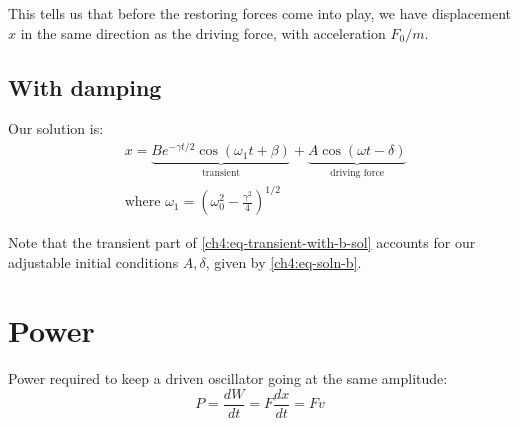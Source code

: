 This tells us that before the restoring forces come into play, we have displacement $x$ in the same direction as the driving force, with acceleration $F_0/m$.

\subsection{With damping}

Our solution is:
\begin{equation}
\boxed{
	\begin{split}
		&x = \underbrace{Be^{-\gamma t/2} \cos(\omega_1 t + \beta)}_\text{transient} + \underbrace{A\cos(\omega t - \delta)}_\text{driving force}
		\\
		&\text{where }
		\omega_1 = \left(\omega_0^2 - \frac{\gamma^2}{4} \right)^{1/2}
	\end{split}
}	\label{ch4:eq-transient-with-b-sol}
\end{equation}

Note that the transient part of \eqref{ch4:eq-transient-with-b-sol} accounts for our adjustable initial conditions $A, \delta$, given by \eqref{ch4:eq-soln-b}.



\section{Power}
Power required to keep a driven oscillator going at the same amplitude:
\[ P = \frac{dW}{dt} = F\frac{dx}{dt} = Fv \]